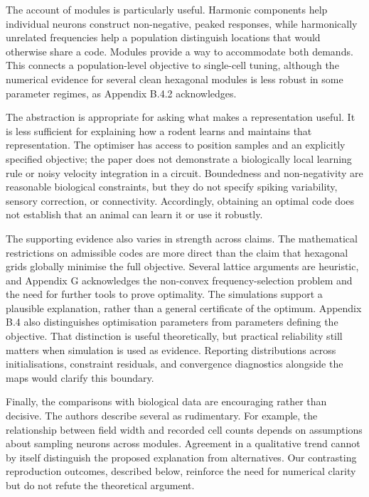 \documentclass[10pt,letterpaper]{article}
\begin{document}
The account of modules is particularly useful. Harmonic components help individual neurons construct non-negative, peaked responses, while harmonically unrelated frequencies help a population distinguish locations that would otherwise share a code. Modules provide a way to accommodate both demands. This connects a population-level objective to single-cell tuning, although the numerical evidence for several clean hexagonal modules is less robust in some parameter regimes, as Appendix B.4.2 acknowledges.

The abstraction is appropriate for asking what makes a representation useful. It is less sufficient for explaining how a rodent learns and maintains that representation. The optimiser has access to position samples and an explicitly specified objective; the paper does not demonstrate a biologically local learning rule or noisy velocity integration in a circuit. Boundedness and non-negativity are reasonable biological constraints, but they do not specify spiking variability, sensory correction, or connectivity. Accordingly, obtaining an optimal code does not establish that an animal can learn it or use it robustly.

The supporting evidence also varies in strength across claims. The mathematical restrictions on admissible codes are more direct than the claim that hexagonal grids globally minimise the full objective. Several lattice arguments are heuristic, and Appendix G acknowledges the non-convex frequency-selection problem and the need for further tools to prove optimality. The simulations support a plausible explanation, rather than a general certificate of the optimum. Appendix B.4 also distinguishes optimisation parameters from parameters defining the objective. That distinction is useful theoretically, but practical reliability still matters when simulation is used as evidence. Reporting distributions across initialisations, constraint residuals, and convergence diagnostics alongside the maps would clarify this boundary.

Finally, the comparisons with biological data are encouraging rather than decisive. The authors describe several as rudimentary. For example, the relationship between field width and recorded cell counts depends on assumptions about sampling neurons across modules. Agreement in a qualitative trend cannot by itself distinguish the proposed explanation from alternatives. Our contrasting reproduction outcomes, described below, reinforce the need for numerical clarity but do not refute the theoretical argument.
\end{document}
